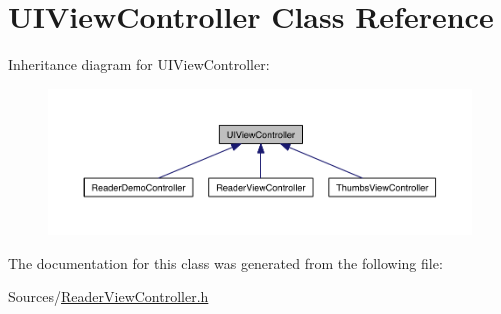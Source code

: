 \hypertarget{class_u_i_view_controller}{\section{U\-I\-View\-Controller Class Reference}
\label{d7/d7e/class_u_i_view_controller}
}


Inheritance diagram for U\-I\-View\-Controller\-:
\nopagebreak
\begin{figure}[H]
\begin{center}
\leavevmode
\includegraphics[width=350pt]{d6/da2/class_u_i_view_controller__inherit__graph}
\end{center}
\end{figure}


The documentation for this class was generated from the following file\-:\begin{DoxyCompactItemize}
\item 
Sources/\hyperlink{_reader_view_controller_8h}{Reader\-View\-Controller.\-h}\end{DoxyCompactItemize}
